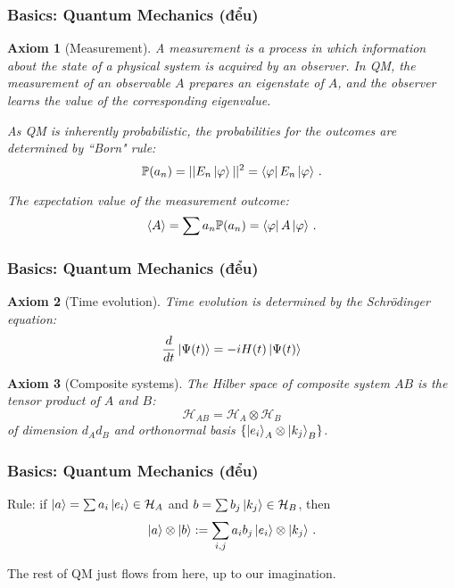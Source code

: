 \documentclass[12pt]{beamer}
\newtheorem{axiom}{Axiom}
\begin{document}
\begin{frame}
\frametitle{Basics: Quantum Mechanics (đểu)}
\begin{axiom}[Measurement]
    A measurement is a process in which information about the state of a physical system
    is acquired by an observer. 
    In QM, the measurement of an observable $A$ prepares an eigenstate of $A$, 
    and the observer learns the value of the corresponding eigenvalue. 

    As QM is inherently probabilistic, the probabilities for the outcomes are determined by ``Born" rule:
    \begin{equation*}
        \mathbb{P}(a_n) = || E_n \ket{\varphi} ||^2 = \bra{\varphi} E_n \ket{\varphi} \,. 
    \end{equation*}

    The expectation value of the measurement outcome:
    \pause
    \begin{equation*}
        \langle A \rangle = \sum a_n \mathbb{P}(a_n) = \bra{\varphi} A \ket{\varphi} \,.
    \end{equation*}
\end{axiom}
    
\end{frame}


\begin{frame}
\frametitle{Basics: Quantum Mechanics (đểu)}
\begin{axiom}[Time evolution]
    Time evolution is determined by the Schr\"odinger equation:
    \begin{equation*}
    \frac{d}{dt} \ket{\Psi(t)} = -i H(t)\ket{\Psi(t)}
    \end{equation*}
\end{axiom}

\begin{axiom}[Composite systems]
    The Hilber space of composite system $AB$ is the tensor product of $A$ and $B$:
    \begin{equation*}
        \mathcal{H}_{AB} = \mathcal{H}_A \otimes \mathcal{H}_B
    \end{equation*}
    of dimension $d_A d_B$ and orthonormal basis $\{ \ket{e_i}_A \otimes \ket{k_j}_B \}$.
\end{axiom}

\end{frame}


\begin{frame}
\frametitle{Basics: Quantum Mechanics (đểu)}
Rule: if $\ket{a} = \sum a_i \ket{e_i} \in \mathcal{H}_A$ and 
$b = \sum b_j \ket{k_j} \in \mathcal{H}_B$, then
\begin{equation*}
    \ket{a} \otimes \ket{b} := \sum_{i,j} a_ib_j \ket{e_i}\otimes \ket{k_j} \,.
\end{equation*}
\pause

The rest of QM just flows from here, up to our imagination.
\end{frame}
\end{document}
